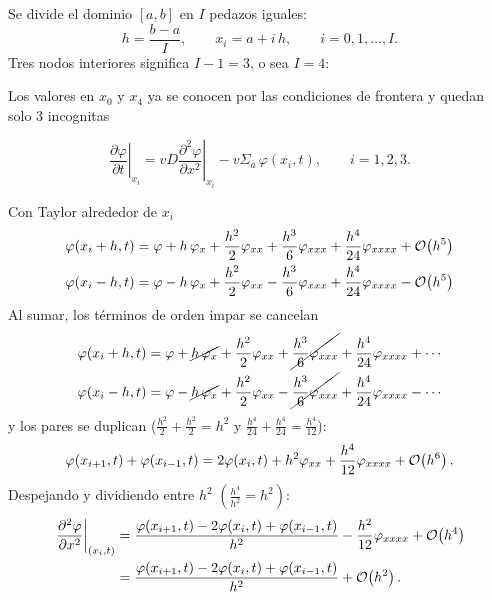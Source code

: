 Se divide el dominio $[a, b]$ en $I$ pedazos iguales:
\[
  h = \frac{b - a}{I}, \qquad x_i = a + i\,h, \qquad i = 0, 1, \dots, I .
\]
Tres nodos interiores significa $I - 1 = 3$, o sea $I = 4$:
\begin{center}
\end{center}
Los valores en $x_0$ y $x_4$ ya se conocen por las condiciones de frontera y quedan solo 3 incognitas

\[
  \left.\frac{\partial\varphi}{\partial t}\right|_{x_i}
  = vD \left.\frac{\partial^2\varphi}{\partial x^2}\right|_{x_i} - v\Sigma_a\, \varphi(x_i, t),
  \qquad i = 1, 2, 3 .
\]

Con Taylor alrededor de $x_i$ 
\begin{align*}
  \varphi(x_i + h, t) &= \varphi + h\,\varphi_x + \frac{h^2}{2}\varphi_{xx}
     + \frac{h^3}{6}\varphi_{xxx} + \frac{h^4}{24}\varphi_{xxxx} + \mathcal{O}\!\left(h^5\right)\\
  \varphi(x_i - h, t) &= \varphi - h\,\varphi_x + \frac{h^2}{2}\varphi_{xx}
     - \frac{h^3}{6}\varphi_{xxx} + \frac{h^4}{24}\varphi_{xxxx} - \mathcal{O}\!\left(h^5\right)
\end{align*}
Al sumar, los términos de orden impar se cancelan
\begin{align*}
  \varphi(x_i + h, t) &= \varphi + \cancel{h\,\varphi_x} + \frac{h^2}{2}\varphi_{xx}
     + \cancel{\frac{h^3}{6}\varphi_{xxx}} + \frac{h^4}{24}\varphi_{xxxx} + \cdots\\
  \varphi(x_i - h, t) &= \varphi - \cancel{h\,\varphi_x} + \frac{h^2}{2}\varphi_{xx}
     - \cancel{\frac{h^3}{6}\varphi_{xxx}} + \frac{h^4}{24}\varphi_{xxxx} - \cdots
\end{align*}
y los pares se duplican ($\frac{h^2}{2} + \frac{h^2}{2} = h^2$ y
$\frac{h^4}{24} + \frac{h^4}{24} = \frac{h^4}{12}$):
\[
  \varphi(x_{i+1}, t) + \varphi(x_{i-1}, t) = 2\varphi(x_i, t) + h^2\varphi_{xx} + \frac{h^4}{12}\varphi_{xxxx} + \mathcal{O}\!\left(h^6\right).
\]
Despejando y dividiendo entre $h^2$ $\left(\frac{h^4}{h^2} = h^2\right)$:
\begin{align*}
  \left.\frac{\partial^2\varphi}{\partial x^2}\right|_{(x_i,t)}
  &= \frac{\varphi(x_{i+1}, t) - 2\varphi(x_i, t) + \varphi(x_{i-1}, t)}{h^2} - \frac{h^2}{12}\varphi_{xxxx} + \mathcal{O}\!\left(h^4\right)\\
  &= \frac{\varphi(x_{i+1}, t) - 2\varphi(x_i, t) + \varphi(x_{i-1}, t)}{h^2} + \mathcal{O}\!\left(h^2\right).
\end{align*}

